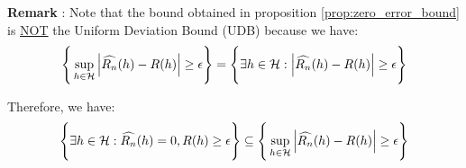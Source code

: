 \noindent \textbf{Remark} : Note that the bound obtained in proposition \ref{prop:zero_error_bound} is \underline{NOT} the Uniform Deviation Bound (UDB) because we have:
\begin{align*}
    \Bigg\{ 
        \sup_{h\in\mathcal{H}} \Big| 
            \widehat{R_n}(h) - R(h)
         \Big|\ge\epsilon
     \Bigg\}
    = 
    \Bigg\{ 
        \exists h \in \mathcal{H} :  \Big| 
            \widehat{R_n}(h) - R(h)
         \Big|\ge\epsilon
     \Bigg\}
\end{align*}

\noindent Therefore, we have:
\begin{align*}
    \Bigg\{ 
        \exists h \in \mathcal{H} : \widehat{R_n}(h) = 0, R(h)\ge\epsilon
     \Bigg\} \subseteq \Bigg\{ 
        \sup_{h\in\mathcal{H}} \Big| 
            \widehat{R_n}(h) - R(h)
         \Big|\ge\epsilon
     \Bigg\}
\end{align*}

\newpage


